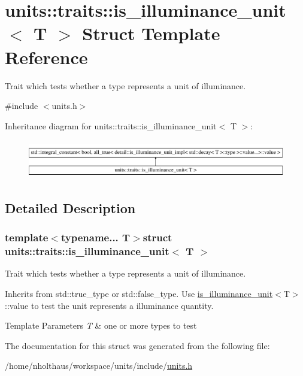 \hypertarget{structunits_1_1traits_1_1is__illuminance__unit}{}\section{units\+:\+:traits\+:\+:is\+\_\+illuminance\+\_\+unit$<$ T $>$ Struct Template Reference}
\label{structunits_1_1traits_1_1is__illuminance__unit}


Trait which tests whether a type represents a unit of illuminance.  




{\ttfamily \#include $<$units.\+h$>$}

Inheritance diagram for units\+:\+:traits\+:\+:is\+\_\+illuminance\+\_\+unit$<$ T $>$\+:\begin{figure}[H]
\begin{center}
\leavevmode
\includegraphics[height=1.709924cm]{structunits_1_1traits_1_1is__illuminance__unit}
\end{center}
\end{figure}


\subsection{Detailed Description}
\subsubsection*{template$<$typename... T$>$struct units\+::traits\+::is\+\_\+illuminance\+\_\+unit$<$ T $>$}

Trait which tests whether a type represents a unit of illuminance. 

Inherits from {\ttfamily std\+::true\+\_\+type} or {\ttfamily std\+::false\+\_\+type}. Use {\ttfamily \hyperlink{structunits_1_1traits_1_1is__illuminance__unit}{is\+\_\+illuminance\+\_\+unit}$<$T$>$\+::value} to test the unit represents a illuminance quantity. 
\begin{DoxyTemplParams}{Template Parameters}
{\em T} & one or more types to test \\
\hline
\end{DoxyTemplParams}


The documentation for this struct was generated from the following file\+:\begin{DoxyCompactItemize}
\item 
/home/nholthaus/workspace/units/include/\hyperlink{units_8h}{units.\+h}\end{DoxyCompactItemize}
